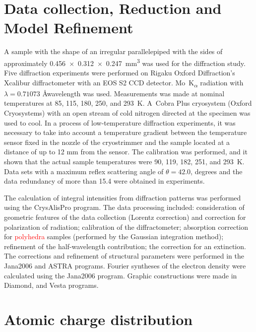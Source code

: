 \documentclass[preprint,review,12pt]{elsarticle}
\begin{document}
\section{Data collection, Reduction and Model Refinement}\label{sec:level1}
A sample with the shape of an irregular parallelepiped with the sides of approximately 0.456~$\times$~0.312~$\times$~0.247~mm\textsuperscript{3} was used for the diffraction study. Five diffraction experiments were performed on Rigaku Oxford Diffraction's Xcalibur diffractometer with an EOS S2 CCD detector. Mo~K\textsubscript{$\alpha$} radiation with  $\lambda=0.71073$ \AA  wavelength was used. Measurements was made at nominal temperatures at
85, 115, 180, 250, and 293~K.
A~Cobra Plus cryosystem (Oxford Cryosystems) with an open stream of cold nitrogen directed at the specimen was used to cool.
In a process of low-temperature diffraction experiments, it was necessary to take into account a temperature gradient between the temperature sensor fixed in the nozzle of the cryostrimmer and the sample located at a distance of up to 12 mm from the sensor.
The calibration was performed\cite{Dudka2016_2}, and it shown that the actual sample temperatures were 90, 119, 182, 251, and 293~K. Data sets with a maximum reflex scattering angle of $\theta=42.0$, degrees and the data redundancy of more than 15.4 were obtained in experiments.

The calculation of integral intensities from diffraction patterns was performed using the CrysAlisPro program\cite{Rigaku}.
The data processing included: consideration of geometric features of the data collection (Lorentz correction) and correction for polarization of radiation; calibration of the diffractometer\cite{Dudka2010}; absorption correction for \textcolor{red}{polyhedra} samples (performed by the Gaussian integration method\cite{Busing1957}); refinement of the half-wavelength contribution\cite{Dudka2010_2}; the correction for an extinction\cite{Becker1974}.
The corrections and refinement of structural parameters were performed in the Jana2006\cite{Petek2014} and ASTRA programs\cite{Dudka2007}.
Fourier syntheses of the electron density were calculated using the Jana2006 program\cite{Petek2014}.
Graphic constructions were made in Diamond\cite{Diamont}, and Vesta programs\cite{Momma2011}.


\section{Atomic charge distribution}\label{sec:level1}
\end{document}
